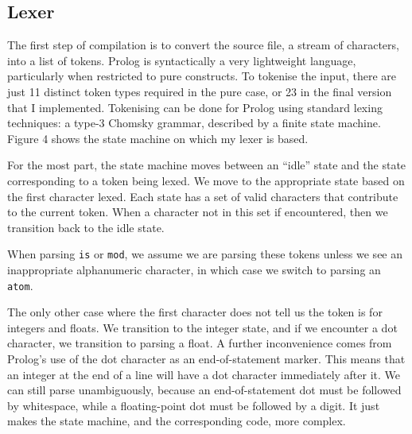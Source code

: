 \documentclass[12pt]{article}
\begin{document}
\subsection{Lexer}

The first step of compilation is to convert the source file, a stream of characters, into a list of tokens. 
Prolog is syntactically a very lightweight language, particularly when restricted to pure constructs. 
To tokenise the input, there are just 11 distinct token types required in the pure case, or 23 in the final version that I implemented. 
Tokenising can be done for Prolog using standard lexing techniques: a type-3 Chomsky grammar, described by a finite state machine.
Figure 4 shows the state machine on which my lexer is based.

For the most part, the state machine moves between an ``idle'' state and the state corresponding to a token being lexed. 
We move to the appropriate state based on the first character lexed. 
Each state has a set of valid characters that contribute to the current token. 
When a character not in this set if encountered, then we transition back to the idle state.

When parsing \verb|is| or \verb|mod|, we assume we are parsing these tokens unless we see an inappropriate alphanumeric character, in which case we switch to parsing an \verb|atom|.

The only other case where the first character does not tell us the token is for integers and floats. 
We transition to the integer state, and if we encounter a dot character, we transition to parsing a float.
A further inconvenience comes from Prolog's use of the dot character as an end-of-statement marker. 
This means that an integer at the end of a line will have a dot character immediately after it. 
We can still parse unambiguously, because an end-of-statement dot must be followed by whitespace, while a floating-point dot must be followed by a digit. 
It just makes the state machine, and the corresponding code, more complex.

\newpage
\end{document}
